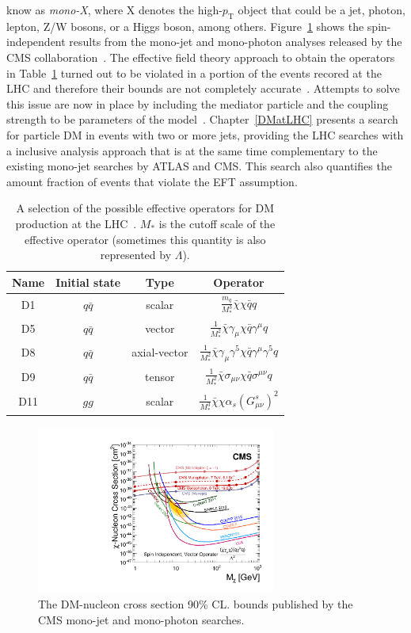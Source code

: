 know as \textit{mono-X}, where X denotes the high-$p_{\mathrm{T}}$
object that could be a jet, photon, lepton, Z/W bosons, or a Higgs
boson, among others. Figure~\ref{fig:CMSlimits} shows the
spin-independent results from the mono-jet and mono-photon analyses
released by the CMS
collaboration~\cite{Aad:2011xw,Chatrchyan:2012me,Khachatryan:2014rwa,Aad:2014tda}. The
effective field theory approach to obtain the operators in
Table~\ref{tab:EFT} turned out to be violated in a portion
of the events recored at the LHC and therefore their bounds are not
completely accurate~\cite{Riotto1,Riotto2,Riotto3}. Attempts to solve this issue are now in
place by including the mediator particle and the coupling strength to
be parameters of the model~\cite{DMFORUM}. Chapter~\ref{DMatLHC} presents a
search for particle DM in events with two or more jets, providing the
LHC searches with a inclusive analysis approach that is at the same
time complementary to the existing mono-jet searches by ATLAS and
CMS. This search also quantifies the amount fraction of events that
violate the EFT assumption.

\begin{table}[htb]
\centering
\large
\begin{tabular}{cccc}
  \hline
  \hline
  Name &  Initial state &  Type & Operator\\
  \hline                                                        
  D1 & $q\bar{q}$ &  scalar & $\frac{m_{q}}{M^{3}_{*}}\bar{\chi}\chi\bar{q}q$\\
  D5 & $q\bar{q}$ & vector & $\frac{1}{M^{2}_{*}}\bar{\chi}\gamma_{\mu}\chi\bar{q}\gamma^{\mu} q$\\
  D8 & $q\bar{q}$ &  axial-vector & $\frac{1}{M^{2}_{*}}\bar{\chi}\gamma_{\mu}\gamma^{5}\chi\bar{q}\gamma^{\mu}\gamma^{5} q$\\
  D9 & $q\bar{q}$ &  tensor & $\frac{1}{M^{2}_{*}}\bar{\chi}\sigma_{\mu\nu}\chi\bar{q}\sigma^{\mu\nu} q$\\
  D11 & $gg$ &  scalar & $\frac{1}{M^{3}_{*}}\bar{\chi}\chi\alpha_{s}(G^{s}_{\mu\nu})^2$\\
  \hline
  \hline
\end{tabular}
  \caption{\label{tab:EFT}A selection of the possible effective operators for DM production at
    the LHC~\cite{EFTColliders}. $M_{*}$ is the cutoff scale of
    the effective operator (sometimes this quantity is also
    represented by $\Lambda$).}
\end{table}

\begin{figure}
 \centering
\includegraphics[width=0.7\textwidth]{IntroFigures/dm_limit.pdf}
\caption{The DM-nucleon cross section 90\% CL. bounds published by
  the CMS mono-jet
  and mono-photon searches.\label{fig:CMSlimits}}
\end{figure}